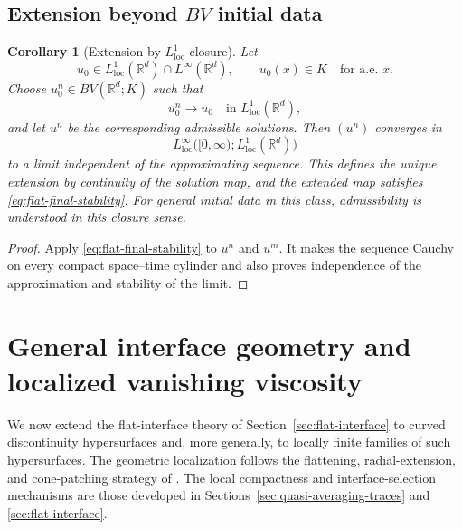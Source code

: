 \documentclass[11pt]{amsart}
\numberwithin{equation}{section}
\theoremstyle{plain}
\newtheorem{corollary}[theorem]{Corollary}
\theoremstyle{definition}
\theoremstyle{remark}
\begin{document}
\subsection{Extension beyond \(BV\) initial data}
\label{subsec:flat-extension-l1}

\begin{corollary}[Extension by \(L^1_{\mathrm{loc}}\)-closure]
\label{cor:flat-extension-l1}
Let
\[
    u_0\in
    L^1_{\mathrm{loc}}(\mathbb R^d)
    \cap L^\infty(\mathbb R^d),
    \qquad
    u_0(x)\in K
    \quad\text{for a.e. }x.
\]
Choose \(u_0^n\in BV(\mathbb R^d;K)\) such that
\[
    u_0^n\longrightarrow u_0
    \quad\text{in }L^1_{\mathrm{loc}}(\mathbb R^d),
\]
and let \(u^n\) be the corresponding admissible solutions. Then
\((u^n)\) converges in
\[
    L^\infty_{\mathrm{loc}}
    \bigl(
        [0,\infty);
        L^1_{\mathrm{loc}}(\mathbb R^d)
    \bigr)
\]
to a limit independent of the approximating sequence. This defines the
unique extension by continuity of the solution map, and the extended map
satisfies \eqref{eq:flat-final-stability}. For general initial data in this
class, admissibility is understood in this closure sense.
\end{corollary}

\begin{proof}
Apply \eqref{eq:flat-final-stability} to \(u^n\) and \(u^m\). It makes the
sequence Cauchy on every compact space--time cylinder and also proves
independence of the approximation and stability of the limit.
\end{proof}





\section{General interface geometry and localized vanishing viscosity}
\label{sec:general-interface}

We now extend the flat-interface theory of
Section~\ref{sec:flat-interface} to curved discontinuity hypersurfaces and,
more generally, to locally finite families of such hypersurfaces. The
geometric localization follows the flattening, radial-extension, and
cone-patching strategy of
\cite[Section~2]{Mitrovic2025Nondegenerate}. The local compactness and
interface-selection mechanisms are those developed in
Sections~\ref{sec:quasi-averaging-traces} and
\ref{sec:flat-interface}.
\end{document}
